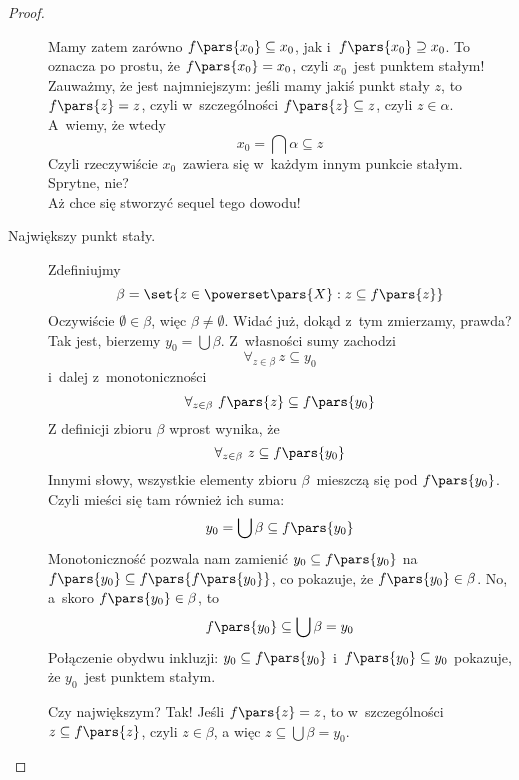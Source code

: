 \begin{proof}
\begin{description}
            Mamy zatem zarówno \(f\pars{x_0} \subseteq x_0\), jak i~\(f\pars{x_0} \supseteq x_0\). To oznacza po prostu, że \(f\pars{x_0} = x_0\), czyli \(x_0\)~jest punktem stałym! Zauważmy, że jest najmniejszym: jeśli mamy jakiś punkt stały \(z\), to \(f\pars{z} = z\), czyli w~szczególności \(f\pars{z} \subseteq z\), czyli \(z \in \alpha\). A~wiemy, że wtedy
            \begin{equation*}
                x_0 = \bigcap \alpha \subseteq z
            \end{equation*}
            Czyli rzeczywiście \(x_0\)~zawiera się w~każdym innym punkcie stałym. Sprytne, nie? \\ Aż chce się stworzyć sequel tego dowodu!
        \item[Największy punkt stały.] Zdefiniujmy
            \begin{equation*}
                \beta = \set{z \in \powerset\pars{X} : z \subseteq f\pars{z}}
            \end{equation*}
            Oczywiście \(\emptyset \in \beta\), więc \(\beta \neq \emptyset\). Widać już, dokąd z~tym zmierzamy, prawda? Tak jest, bierzemy \(y_0 = \bigcup \beta\). Z~własności sumy zachodzi
            \begin{equation*}
                \forall_{z \in \beta} \ z \subseteq y_0
            \end{equation*}
            i~dalej z~monotoniczności
            \begin{equation*}
                \forall_{z \in \beta} \ f\pars{z} \subseteq f\pars{y_0}
            \end{equation*}
            Z definicji zbioru \(\beta\) wprost wynika, że
            \begin{equation*}
                \forall_{z \in \beta} \ z \subseteq f\pars{y_0}
            \end{equation*}
            Innymi słowy, wszystkie elementy zbioru \(\beta\)~mieszczą się pod \(f\pars{y_0}\). Czyli mieści się tam również ich suma:
            \begin{equation*}
                y_0 = \bigcup \beta \subseteq f\pars{y_0}
            \end{equation*}
            Monotoniczność pozwala nam zamienić \(y_0 \subseteq f\pars{y_0}\) na \(f\pars{y_0} \subseteq f\pars{f\pars{y_0}}\), co pokazuje, że \(f\pars{y_0} \in \beta\). No, a~skoro \(f\pars{y_0} \in \beta\), to
            \begin{equation*}
                f\pars{y_0} \subseteq \bigcup \beta = y_0
            \end{equation*}
            Połączenie obydwu inkluzji: \(y_0 \subseteq f\pars{y_0}\) i~\(f\pars{y_0} \subseteq y_0\) pokazuje, że \(y_0\)~jest punktem stałym.
            
            Czy największym? Tak! Jeśli \(f\pars{z} = z\), to w~szczególności \(z \subseteq f\pars{z}\), czyli \(z \in \beta\), a więc \(z \subseteq \bigcup \beta = y_0\).
    \end{description}
\end{proof}
